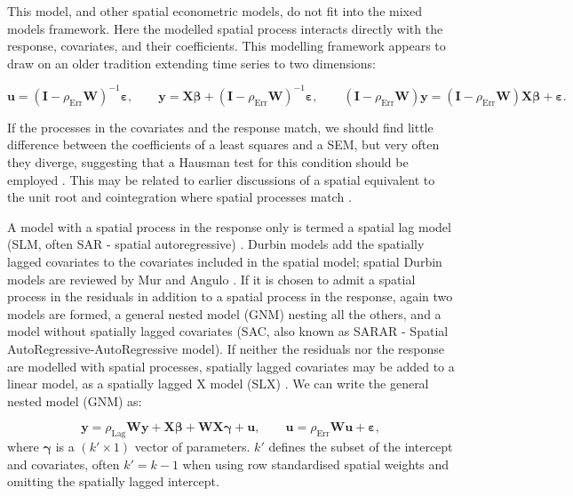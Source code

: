 \documentclass[]{book}
\begin{document}
This model, and other spatial econometric models, do not fit into the mixed models framework. Here the modelled spatial process interacts directly with the response, covariates, and their coefficients. This modelling framework appears to draw on an older tradition extending time series to two dimensions:

\[
{\mathbf u} = ({\mathbf I} - \rho_{\mathrm{Err}} {\mathbf W})^{-1} {\mathbf \varepsilon},
\qquad {\mathbf y} = {\mathbf X}{\mathbf \beta} + ({\mathbf I} - \rho_{\mathrm{Err}} {\mathbf W})^{-1} {\mathbf \varepsilon},
\qquad ({\mathbf I} - \rho_{\mathrm{Err}} {\mathbf W}) {\mathbf y} = ({\mathbf I} - \rho_{\mathrm{Err}} {\mathbf W}) {\mathbf X}{\mathbf \beta} + {\mathbf \varepsilon}.
\]

If the processes in the covariates and the response match, we should find little difference between the coefficients of a least squares and a SEM, but very often they diverge, suggesting that a Hausman test for this condition should be employed \citep{pace+lesage:08}. This may be related to earlier discussions of a spatial equivalent to the unit root and cointegration where spatial processes match \citep{fingleton:99}.

A model with a spatial process in the response only is termed a spatial lag model (SLM, often SAR - spatial autoregressive) \citep{lesage+pace:09}. Durbin models add the spatially lagged covariates to the covariates included in the spatial model; spatial Durbin models are reviewed by Mur and Angulo \citeyearpar{mur+angulo:06}. If it is chosen to admit a spatial process in the residuals in addition to a spatial process in the response, again two models are formed, a general nested model (GNM) nesting all the others, and a model without spatially lagged covariates (SAC, also known as SARAR - Spatial AutoRegressive-AutoRegressive model). If neither the residuals nor the response are modelled with spatial processes, spatially lagged covariates may be added to a linear model, as a spatially lagged X model (SLX) \citep{elhorst:10, bivand:12, lesage:14, halleck-vega+elhorst:15}. We can write the general nested model (GNM) as:

\[
{\mathbf y} = \rho_{\mathrm{Lag}} {\mathbf W}{\mathbf y} + {\mathbf X}{\mathbf \beta} + {\mathbf W}{\mathbf X}{\mathbf \gamma} + {\mathbf u},
\qquad {\mathbf u} = \rho_{\mathrm{Err}} {\mathbf W} {\mathbf u} + {\mathbf \varepsilon},
\]
where \({\mathbf \gamma}\) is a \((k' \times 1)\) vector of parameters. \(k'\) defines the subset of the intercept and covariates, often \(k' = k-1\) when using row standardised spatial weights and omitting the spatially lagged intercept.
\end{document}
